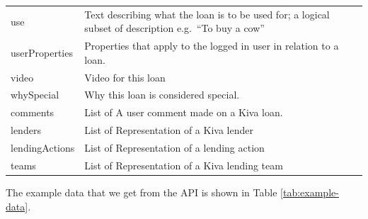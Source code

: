 \begin{longtable}{|p{}|p{}|}
	use                                  & Text describing what the loan is to be used for; a logical subset
	of description e.g.~``To buy a cow''                                                                     \\
	userProperties                       & Properties that apply to the logged in user in relation
	to a loan.                                                                                               \\
	video                                & Video for this loan                                               \\
	whySpecial                           & Why this loan is considered special.                              \\
	comments                             & List of A user comment made on a Kiva loan.                       \\
	lenders                              & List of Representation of a Kiva lender                           \\
	lendingActions                       & List of Representation of a lending action                        \\
	teams                                & List of Representation of a Kiva lending team                     \\
\end{longtable}

The example data that we get from the API is shown in Table \ref{tab:example-data}.

